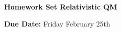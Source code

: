 


\thispagestyle{fancy}






\begin{center}
{\huge \textbf{Homework Set Relativistic QM}}
\large

{\textbf{ Due Date:} Friday February 25th   } 
\end{center}

